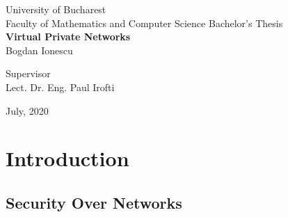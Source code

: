 \documentclass[a4paper,12pt]{report}
\begin{document}
	\begin{titlepage}
		\begin{center}
			\vspace{-10in}
			{\LARGE University of Bucharest \\
			Faculty of Mathematics and Computer Science }
			\vfill
			{\large Bachelor's Thesis} \\
			\vspace{10mm}
			\textbf{\huge Virtual Private Networks} \\
			{\Large Bogdan Ionescu} \\
			\vspace{20mm}
			\begin{flushleft}{\large Supervisor \\
			Lect. Dr. Eng. Paul Irofti}
			\end{flushleft}
			\vfill
			July, 2020
		\restoregeometry
		\end{center}
	\end{titlepage}
	\author{Bogdan Ionescu}
	\date{\today}
	
	\begin{abstract}
		This thesis aims to describe different potential security vulnerabilities when using public networks, such as the Internet, as well as suitable methods on how they can be resolved. The first chapter presents the dangers one might encounter while traversing public networks and how VPNs make use of tunneling protocols to mitigate them. We then take a deep dive into IPsec, a very popular and adaptable network protocol suite designed to address a plethora of security needs for both casual users and businesses. Finally, a software application written in the Go programming language is outlined, with the purpose of demonstrating how securing network traffic would be implemented.
	\end{abstract}		
	
	\tableofcontents
	
	\setlength{\glsdescwidth}{\hsize}
	\glsaddall
	\printglossary[type=\acronymtype,nonumberlist]
	
	\chapter{Introduction}
	
	\section{Security Over Networks}
		
\end{document}
